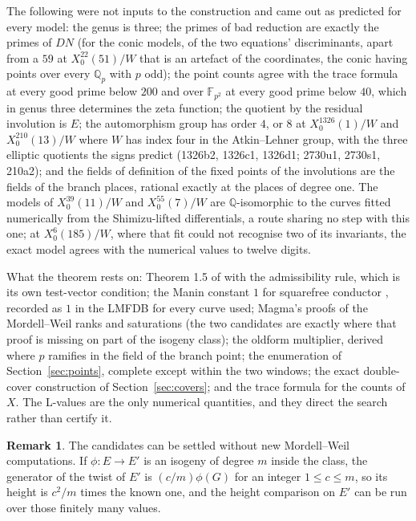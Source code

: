 \documentclass[11pt,reqno]{amsart}
\theoremstyle{plain}
\theoremstyle{definition}
\newtheorem{remark}[theorem]{Remark}
\newcommand{\Q}{\mathbb{Q}}
\newcommand{\F}{\mathbb{F}}
\begin{document}
The following were not inputs to the construction and came out as predicted for every model: the
genus is three; the primes of bad reduction are exactly the primes of $DN$ (for the conic models,
of the two equations' discriminants, apart from a $59$ at $X_0^{22}(51)/W$ that is an artefact of
the coordinates, the conic having points over every $\Q_p$ with $p$ odd); the point counts agree
with the trace formula at every good prime below $200$ and over $\F_{p^2}$ at every good prime
below $40$, which in genus three determines the zeta function; the quotient by the residual
involution is $E$; the automorphism group has order $4$, or $8$ at $X_0^{1326}(1)/W$ and
$X_0^{210}(13)/W$ where $W$ has index four in the Atkin--Lehner group, with the three elliptic
quotients the signs predict (1326b2, 1326c1, 1326d1; 2730u1, 2730s1, 210a2); and the fields of
definition of the fixed points of the involutions are the fields of the branch places, rational
exactly at the places of degree one. The models of $X_0^{39}(11)/W$ and $X_0^{55}(7)/W$ are
$\Q$-isomorphic to the curves fitted numerically from the Shimizu-lifted differentials, a route
sharing no step with this one; at $X_0^6(185)/W$, where that fit could not recognise two of its
invariants, the exact model agrees with the numerical values to twelve digits.

What the theorem rests on: Theorem 1.5 of \cite{cst} with the admissibility rule, which is its own
test-vector condition; the Manin constant $1$ for squarefree conductor \cite{cesnavicius}, recorded
as $1$ in the LMFDB for every curve used; Magma's proofs of the Mordell--Weil ranks and saturations
(the two candidates are exactly where that proof is missing on part of the isogeny class); the
oldform multiplier, derived where $p$ ramifies in the field of the branch point; the enumeration of
Section~\ref{sec:points}, complete except within the two windows; the exact double-cover
construction of Section~\ref{sec:covers}; and the trace formula for the counts of $X$. The
L-values are the only numerical quantities, and they direct the search rather than certify it.

\begin{remark}
The candidates can be settled without new Mordell--Weil computations. If $\phi\colon E\to E'$ is an
isogeny of degree $m$ inside the class, the generator of the twist of $E'$ is $(c/m)\phi(G)$ for an
integer $1\le c\le m$, so its height is $c^2/m$ times the known one, and the height comparison on
$E'$ can be run over those finitely many values.
\end{remark}
\end{document}

